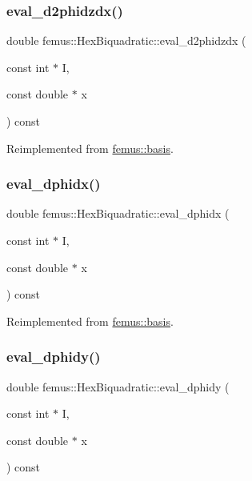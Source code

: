 \subsubsection{\texorpdfstring{eval\+\_\+d2phidzdx()}{eval\_d2phidzdx()}}
{\footnotesize\ttfamily double femus\+::\+Hex\+Biquadratic\+::eval\+\_\+d2phidzdx (\begin{DoxyParamCaption}\item[{const int $\ast$}]{I,  }\item[{const double $\ast$}]{x }\end{DoxyParamCaption}) const\hspace{0.3cm}{\ttfamily [virtual]}}



Reimplemented from \mbox{\hyperlink{classfemus_1_1basis_a5d619ec5bd57b7d2dc34a99d69975c77}{femus\+::basis}}.

\mbox{\label{classfemus_1_1_hex_biquadratic_a751fe53056f2ca2e10559ec75253469e}} 
\subsubsection{\texorpdfstring{eval\+\_\+dphidx()}{eval\_dphidx()}}
{\footnotesize\ttfamily double femus\+::\+Hex\+Biquadratic\+::eval\+\_\+dphidx (\begin{DoxyParamCaption}\item[{const int $\ast$}]{I,  }\item[{const double $\ast$}]{x }\end{DoxyParamCaption}) const\hspace{0.3cm}{\ttfamily [virtual]}}



Reimplemented from \mbox{\hyperlink{classfemus_1_1basis_a4db7d29cf8a753ddbccc4a297dafa0bf}{femus\+::basis}}.

\mbox{\label{classfemus_1_1_hex_biquadratic_afa4cdce4824df2744096af085ab1281e}} 
\subsubsection{\texorpdfstring{eval\+\_\+dphidy()}{eval\_dphidy()}}
{\footnotesize\ttfamily double femus\+::\+Hex\+Biquadratic\+::eval\+\_\+dphidy (\begin{DoxyParamCaption}\item[{const int $\ast$}]{I,  }\item[{const double $\ast$}]{x }\end{DoxyParamCaption}) const\hspace{0.3cm}{\ttfamily [virtual]}}



